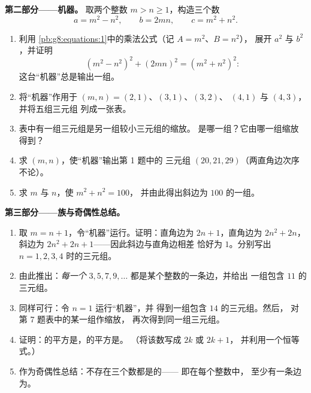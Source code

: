 \begin{problem}[{周末问题——整数直角三角形，
以及恒等式 $(m^2 - n^2)^2 + (2mn)^2 = (m^2 + n^2)^2$，
它能生成全部此类三角形}]
\medskip
\noindent\textbf{第二部分——机器。}
取两个整数 $m > n \geq 1$，构造三个数
\[
a = m^2 - n^2,
\qquad
b = 2mn,
\qquad
c = m^2 + n^2 .
\]
\begin{enumerate}[resume]
  \item 利用
        \cref{pb:g8:equations:1}中的乘法公式（记 $A = m^2$、$B = n^2$），
        展开 $a^2$ 与 $b^2$，并证明
        \[
        \left(m^2 - n^2\right)^2 + (2mn)^2
        = \left(m^2 + n^2\right)^2 :
        \]
        这台“机器”总是输出一组。
  \item 将“机器”作用于 $(m, n) = (2, 1)$、$(3, 1)$、$(3, 2)$、
        $(4, 1)$ 与 $(4, 3)$，并将五组三元组
        列成一张表。
  \item 表中有一组三元组是另一组较小三元组的缩放。
        是哪一组？它由哪一组缩放得到？
  \item 求 $(m, n)$，使“机器”输出第 1 题中的
        三元组 $(20, 21, 29)$（两直角边次序不论）。
  \item 求 $m$ 与 $n$，使 $m^2 + n^2 = 100$，
        并由此得出斜边为 $100$ 的一组。
\end{enumerate}

\medskip
\noindent\textbf{第三部分——族与奇偶性总结。}
\begin{enumerate}[resume]
  \item 取 $m = n + 1$，令“机器”运行。证明：直角边为
        $2n + 1$，直角边为 $2n^2 + 2n$，斜边为
        $2n^2 + 2n + 1$——因此斜边与直角边相差
        恰好为 $1$。分别写出 $n = 1, 2, 3, 4$ 时的三元组。
  \item 由此推出：\emph{每一个} $3, 5, 7, 9, \dots$
        都是某个整数的一条边，并给出
        一组包含 $11$ 的三元组。
  \item {}同样可行：令 $n = 1$ 运行“机器”，并
        得到一组包含 $14$ 的三元组。然后，
        对第 7 题表中的某一组作缩放，
        再次得到同一组三元组。
  \item 证明：的平方是，的平方是。
        （将该数写成 $2k$ 或 $2k + 1$，
        并利用一个恒等式。）
  \item 作为奇偶性总结：不存在三个数都是的——
        即在每个整数中，
        至少有一条边为。
\end{enumerate}
\end{problem}

